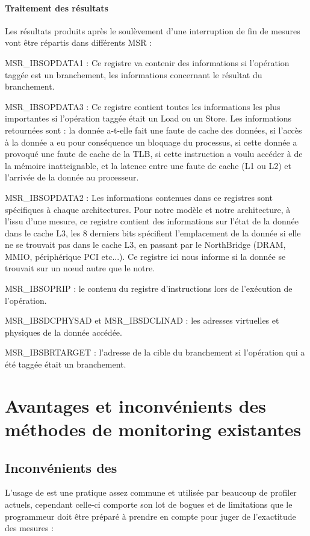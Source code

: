 			\paragraph{Traitement des résultats}
				Les résultats produits après le soulèvement d'une interruption de fin de mesures vont être répartis dans différents MSR : 
				\bitem
					\item{MSR\_IBSOPDATA1 : Ce registre va contenir des informations si l'opération taggée est un branchement, les informations concernant le résultat du branchement.}
					\item{MSR\_IBSOPDATA3 : Ce registre contient toutes les informations les plus importantes si l'opération taggée était un Load ou un Store. Les informations retournées sont : la donnée a-t-elle fait une faute de cache des données, si l'accès à la donnée a eu pour conséquence un bloquage du processus, si cette donnée a  provoqué une faute de cache de la TLB, si cette instruction a voulu accéder à de la mémoire inatteignable, et la latence entre une faute de cache (L1 ou L2) et l'arrivée de la donnée au processeur.}
					\item{MSR\_IBSOPDATA2 : Les informations contenues dans ce registres sont spécifiques à chaque architectures. Pour notre modèle et notre architecture, à l'issu d'une mesure, ce registre contient des informations sur l'état de la donnée dans le cache L3, les 8 derniers bits spécifient l'emplacement de la donnée si elle ne se trouvait pas dans le cache L3, en passant par le NorthBridge (DRAM, MMIO, périphérique PCI etc...). Ce registre ici nous informe si la donnée se trouvait sur un n\oe ud autre que le notre.}
					\item{MSR\_IBSOPRIP : le contenu du registre d'instructions lors de l'exécution de l'opération.}
					\item{MSR\_IBSDCPHYSAD et MSR\_IBSDCLINAD : les adresses virtuelles et physiques de la donnée accédée.}
					\item{MSR\_IBSBRTARGET : l'adresse de la cible du branchement si l'opération qui a été taggée était un branchement.}
				\eitem
			\section{Avantages et inconvénients des méthodes de monitoring existantes}
				\subsection{Inconvénients des \PMC}
					L'usage de \PMC est une pratique assez commune et utilisée par beaucoup de profiler actuels, cependant celle-ci comporte son lot de bogues et de limitations que le programmeur doit être préparé à prendre en compte pour juger de l'exactitude des mesures :
